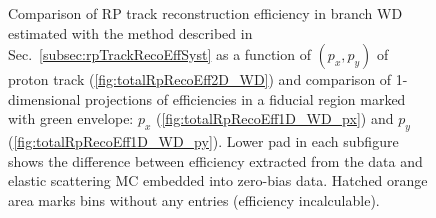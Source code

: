 \begin{figure}[h]%
	\centering
	\parbox{0.54\textwidth}{
		\centering
		\begin{subfigure}[b]{\linewidth}{\vspace{10pt}
				}
		\end{subfigure}
		\begin{minipage}[t][0.64\linewidth][t]{\linewidth}\vspace{10pt}
		\caption[Coparison of estimated RP track reconstruction efficiency in 2D and 1D (branch WD).]%
		{Comparison of RP track reconstruction efficiency in branch WD estimated with the method described in Sec.~\ref{subsec:rpTrackRecoEffSyst} as a function of $(p_{x},p_{y})$ of proton track (\ref{fig:totalRpRecoEff2D_WD}) and comparison of 1-dimensional projections of efficiencies in a fiducial region marked with green envelope: $p_{x}$ (\ref{fig:totalRpRecoEff1D_WD_px}) and $p_{y}$ (\ref{fig:totalRpRecoEff1D_WD_py}). Lower pad in each subfigure shows the difference between efficiency extracted from the data and elastic scattering MC embedded into zero-bias data. Hatched orange area marks bins without any entries (efficiency incalculable).}\label{fig:totalRpRecoEff_WD}
		\end{minipage}
	}
	\quad
	\parbox{0.43\textwidth}{
		\centering
}
\end{figure}
